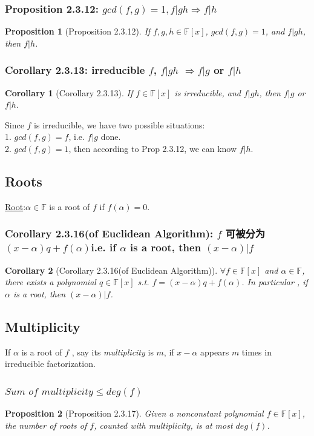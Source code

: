 \documentclass[11pt,a4paper]{article}
\newtheorem{proposition}{Proposition}
\newtheorem{corollary}{Corollary}
\begin{document}
\subsubsection{Proposition 2.3.12: $gcd(f,g)=1, f|gh\Rightarrow f|h$}
\begin{proposition}[Proposition 2.3.12]
If $f,g,h\in\mathbb{F}[x]$, $gcd(f,g)=1$, and $f|gh$, then $f|h$.
\end{proposition}

\subsubsection{Corollary 2.3.13: irreducible $f$, $f|gh$ $\Rightarrow f|g$ or $f|h$}
\begin{corollary}[Corollary 2.3.13]
If $f\in\mathbb{F}[x]$ is irreducible, and $f|gh$, then $f|g$ or $f|h$.
\end{corollary}
Since $f$ is irreducible, we have two possible situations:\\
1. $gcd(f,g)=f$, i.e. $f|g$ done.\\
2. $gcd(f,g)=1$, then according to Prop 2.3.12, we can know $f|h$.\\


\subsection{Roots}
\underline{Root}:$\alpha\in\mathbb{F}$ is a root of $f$ if $f(\alpha)=0$.

\subsubsection{Corollary 2.3.16(of Euclidean Algorithm): $f$ 可被分为 $(x-\alpha)q+f(\alpha)$i.e. if $\alpha$ is a root, then $(x-\alpha)|f$}
\begin{corollary}[Corollary 2.3.16(of Euclidean Algorithm)]
$\forall f\in\mathbb{F}[x]$ and $\alpha\in\mathbb{F}$, there exists a polynomial $q\in\mathbb{F}[x]$ s.t. $f=(x-\alpha)q+f(\alpha)$. In particular , if $\alpha$ is a root, then $(x-\alpha)|f$.
\end{corollary}

\subsection{Multiplicity}
If $\alpha$ is a root of $f$ , say its \textit{multiplicity} is $m$, if $x-\alpha$ appears $m$ times in irreducible factorization.
\subsubsection{$\textit{Sum of multiplicity}\leq deg(f)$}
\begin{proposition}[Proposition 2.3.17]
Given a nonconstant polynomial $f\in\mathbb{F}[x]$, the number of roots of $f$, counted with multiplicity, is at most $deg(f)$.
\end{proposition}
\end{document}
